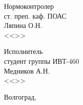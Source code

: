 \begin{minipage}[c]{15em}
Нормоконтролер\\
ст. преп. каф. ПОАС\\
\makebox[2cm]{\hrulefill}Ляпина О.Н.\\
<<\makebox[1.5cm]{\hrulefill}>>\makebox[3.5cm]{\hrulefill}\the\year
\end{minipage}
\hfill
\begin{minipage}[c]{15em}
Исполнитель\\
студент группы ИВТ-460\\
\makebox[2cm]{\hrulefill}Медников А.Н.\\
<<\makebox[1.5cm]{\hrulefill}>>\makebox[3.5cm]{\hrulefill}\the\year
\end{minipage}
\vspace{15mm}
\begin{center}
Волгоград, \the\year
\end{center}
\newpage{}